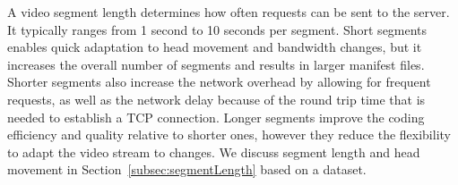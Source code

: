  A video segment length determines how
often requests can be sent to the server. It typically ranges from 1
second to 10 seconds per segment. Short segments enables quick
adaptation to head movement and bandwidth changes, but it increases
the overall number of segments and results in larger manifest files.
Shorter segments also increase the network overhead by allowing for
frequent requests, as well as the network delay because of the round
trip time that is needed to establish a TCP connection.
Longer segments improve the coding efficiency and quality relative to
shorter ones, however they reduce the flexibility to adapt the video
stream to changes. We discuss segment length and head movement in
Section~\ref{subsec:segmentLength} based on a dataset.



